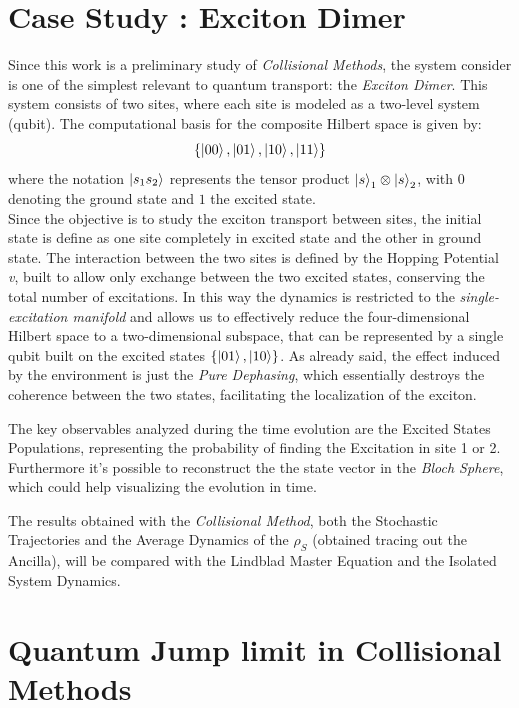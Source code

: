 \documentclass[a4paper,12pt]{article}
\begin{document}
	\section{Case Study : Exciton Dimer}
	\label{sec:exciton_dimer}
	Since this work is a preliminary study of \textit{Collisional Methods}, the system consider is one of the simplest relevant to quantum transport: the \textit{Exciton Dimer}. This system consists of two sites, where each site is modeled as a two-level system (qubit). The computational basis for the composite Hilbert space is given by:
	\begin{equation}
		\left\{\ket{00}, \ket{01}, \ket{10}, \ket{11} \right\}
	\end{equation}
	where the notation $\ket{s_1 s_2}$ represents the tensor product $\ket{s}_1 \otimes \ket{s}_2$, with $0$ denoting the ground state and $1$ the excited state. \\
	Since the objective is to study the exciton transport between sites, the initial state is define as one site completely in excited state and the other in ground state. The interaction between the two sites is defined by the Hopping Potential \textit{v}, built to allow only exchange between the two excited states, conserving the total number of excitations. In this way
	the dynamics is restricted to the \textit{single-excitation manifold} and  allows us to effectively reduce the four-dimensional Hilbert space to a two-dimensional subspace, that can be represented by a single qubit built on the excited states $ \left\{ \ket{01}, \ket{10} \right\} $.
	As already said, the effect induced by the environment is just the \textit{Pure Dephasing}, which essentially destroys the coherence between the two states, facilitating the localization of the exciton.

	The key observables analyzed during the time evolution are the Excited States Populations, representing the probability of finding the Excitation in site 1 or 2. Furthermore it's possible to reconstruct the the state vector in the \textit{Bloch Sphere}, which could help visualizing the evolution in time.

	The results obtained with the \textit{Collisional Method}, both the Stochastic Trajectories and the Average Dynamics of the $ \rho_S $ (obtained tracing out the Ancilla), will be compared with the Lindblad Master Equation and the Isolated System Dynamics.

	\newpage

	\section{Quantum Jump limit in Collisional Methods}
	\label{sec:Quantum_Jump_limit_in_Collisional_Methods}
\end{document}
